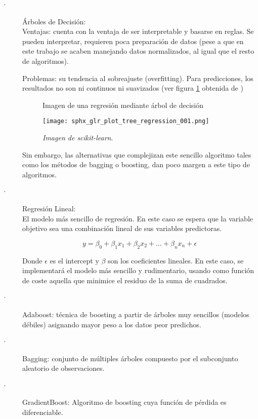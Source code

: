 \documentclass[12pt]{article}
\begin{document}
		\begin{description}
			\item[·] Árboles de Decisión:\\
			Ventajas: cuenta con la ventaja de ser interpretable y basarse en reglas. Se pueden interpretar, requieren poca preparación de datos (pese a que en este trabajo se acaben manejando datos normalizados, al igual que el resto de algoritmos).
			
			Problemas: su tendencia al sobreajuste (overfitting). Para predicciones, los resultados no son ni continuos ni suavizados (ver figura \ref{sphx_glr_plot_tree_regression_001} obtenida de \cite{scikit-learn})
			
			\begin{figure}[H]
				\caption{\label{sphx_glr_plot_tree_regression_001} Imagen de una regresión mediante árbol de decisión}
				\centering
				\hspace*{1cm}
				\texttt{[image: sphx\_glr\_plot\_tree\_regression\_001.png]}
				\caption*{\textit{Imagen de scikit-learn}.}
			\end{figure}
			
			
			Sin embargo, las alternativas que complejizan este sencillo algoritmo tales como los métodos de bagging o boosting, dan poco margen a este tipo de algoritmos.
			
			
			\item[·] Regresión Lineal:\\
			
			El modelo más sencillo de regresión. En este caso se espera que la variable objetivo sea una combinación lineal de sus variables predictoras. 
			
			\begin{equation}
				y = \beta_0 + \beta_1 x_1 + \beta_2 x_2 + \dots + \beta_n x_n + \epsilon
			\end{equation}
		
			Donde $\epsilon$ es el intercept y $\beta$ son los coeficientes lineales. En este caso, se implementará el modelo más sencillo y rudimentario, usando como función de coste aquella que minimice el residuo de la suma de cuadrados.
		
						
			\item[·] Adaboost: técnica de boosting a partir de árboles muy sencillos (modelos débiles) asignando mayor peso a los datos peor predichos.
			\item[·] Bagging: conjunto de múltiples árboles compuesto por el subconjunto aleatorio de observaciones.
			\item[·] GradientBoost: Algoritmo de boosting cuya función de pérdida es diferenciable.
		\end{description}
\end{document}
